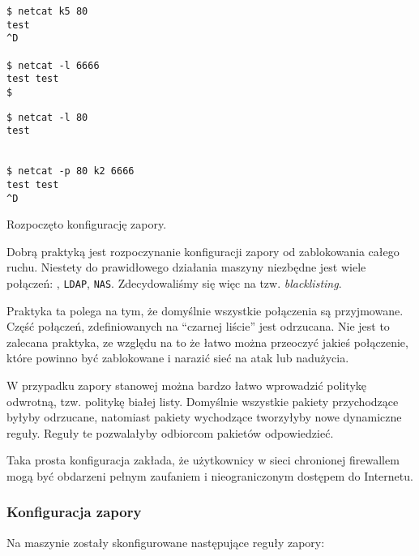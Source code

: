 \begin{minipage}[b]{0.4\linewidth}
\begin{lstlisting}[caption={\kdwa{}}]
$ netcat k5 80
test
^D

$ netcat -l 6666
test test
$
\end{lstlisting}
\end{minipage}
\begin{minipage}[b]{0.12\linewidth}
  \hfill\vspace{1cm}
\end{minipage}
\begin{minipage}[b]{0.4\linewidth}
\begin{lstlisting}[caption={\kpiec{}}]
$ netcat -l 80
test


$ netcat -p 80 k2 6666
test test
^D
\end{lstlisting}
\end{minipage}

Rozpoczęto konfigurację zapory.

Dobrą praktyką jest rozpoczynanie konfiguracji zapory od zablokowania całego ruchu.
Niestety do prawidłowego działania maszyny niezbędne jest wiele połączeń: \ssh{}, \texttt{LDAP}, \texttt{NAS}.
Zdecydowaliśmy się więc na tzw. \emph{blacklisting}.

Praktyka ta polega na tym, że domyślnie wszystkie połączenia są przyjmowane.
Część połączeń, zdefiniowanych na ``czarnej liście'' jest odrzucana.
Nie jest to zalecana praktyka, ze względu na to że łatwo można przeoczyć jakieś połączenie, które powinno być zablokowane i narazić sieć na atak lub nadużycia\cite{bsd:firewall}.

W przypadku zapory stanowej można bardzo łatwo wprowadzić politykę odwrotną, tzw. politykę białej listy.
Domyślnie wszystkie pakiety przychodzące byłyby odrzucane, natomiast pakiety wychodzące tworzyłyby nowe dynamiczne reguły.
Reguły te pozwalałyby odbiorcom pakietów odpowiedzieć.

Taka prosta konfiguracja zakłada, że użytkownicy w sieci chronionej firewallem mogą być obdarzeni pełnym zaufaniem i nieograniczonym dostępem do Internetu.

\subsubsection{Konfiguracja zapory}
Na maszynie \kdwa{} zostały skonfigurowane następujące reguły zapory:


